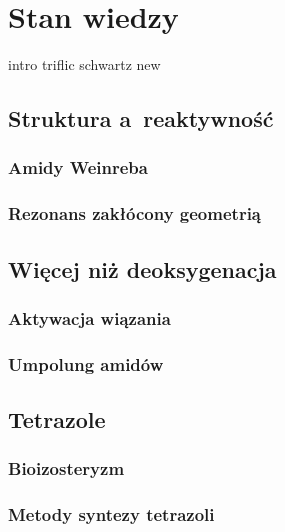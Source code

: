 \chapter{Stan wiedzy}\label{chapter:literature}

{intro}
{triflic}
{schwartz}
{new}

\section{Struktura a~reaktywność}\label{literature:structure}
\subsection{Amidy Weinreba}\label{literature:structure:weinreb}
\subsection{Rezonans zakłócony geometrią}\label{literature:structure:geometry}

\section{Więcej niż deoksygenacja}\label{literature:other}
\subsection{Aktywacja wiązania }\label{literature:other:c-n}
\subsection{Umpolung amidów}\label{literature:other:umpolung}

\section{Tetrazole}\label{literature:tetrazole}
\subsection{Bioizosteryzm}\label{literature:tetrazole:bioisosterizm}
\subsection{Metody syntezy tetrazoli}\label{literature:tetrazole:synthesis}

